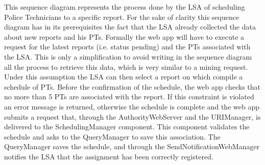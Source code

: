 This sequence diagram represents the process done by the LSA of scheduling Police Technicians to a specific report. For the sake of clarity this sequence diagram has in its prerequisites the fact that the LSA already collected the data about new reports and his PTs. Formally the web app will have to execute a request for the latest reports (i.e. status pending) and the PTs associated with the LSA. This is only a simplification to avoid writing in the sequence diagram all the process to retrieve this data, which is very similar to a mining request. Under this assumption the LSA can then select a report on which compile a schedule of PTs. Before the confirmation of the schedule, the web app checks that no more than 5 PTs are associated with the report. If this constraint is violated an error message is returned, otherwise the schedule is complete and the web app submits a request that, through the AuthorityWebServer and the URIManager, is delivered to the SchedulingManager component. This component validates the schedule and asks to the QueryManager to save this association. The QueryManager saves the schedule, and through the SendNotificationWebManager notifies the LSA that the assignment has been correctly registered.
